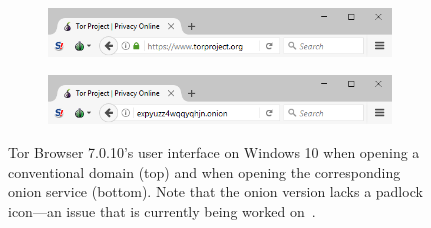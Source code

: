 \begin{figure}[t]
    \centering

    \begin{subfigure}[t]{\linewidth}
        \centering
        \includegraphics[width=\linewidth]{figures/non-onion-service.png}
        \label{fig:non-onion-service}
    \end{subfigure}

    \begin{subfigure}[t]{\linewidth}
        \centering
        \includegraphics[width=\linewidth]{figures/onion-service.png}
        \label{fig:onion-service}
    \end{subfigure}

    \caption{Tor Browser 7.0.10's user interface on Windows 10 when opening a
    conventional domain (top) and when opening the corresponding onion service
    (bottom).  Note that the onion version lacks a padlock icon---an issue
    that is currently being worked on~\cite{trac23247}.}
\end{figure}
